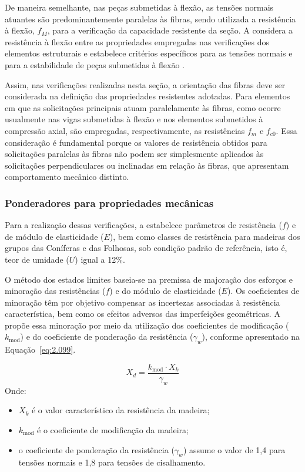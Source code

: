 De maneira semelhante, nas peças submetidas à flexão, as tensões normais atuantes
são predominantemente paralelas às fibras, sendo utilizada a resistência à
flexão, $f_M$, para a verificação da capacidade resistente da seção. A \textcite{NBR7190-1:2022} considera a resistência à flexão entre as propriedades
empregadas nas verificações dos elementos estruturais e estabelece critérios
específicos para as tensões normais e para a estabilidade de peças submetidas
à flexão .

Assim, nas verificações realizadas nesta seção, a orientação das fibras deve ser
considerada na definição das propriedades resistentes adotadas. Para elementos
em que as solicitações principais atuam paralelamente às fibras, como ocorre
usualmente nas vigas submetidas à flexão e nos elementos submetidos à compressão
axial, são empregadas, respectivamente, as resistências $f_m$ e $f_{c0}$.
Essa consideração é fundamental porque os valores de resistência obtidos para
solicitações paralelas às fibras não podem ser simplesmente aplicados às
solicitações perpendiculares ou inclinadas em relação às fibras, que apresentam
comportamento mecânico distinto.


\subsubsection{Ponderadores para propriedades mecânicas}

Para a realização dessas verificações, a \textcite{NBR7190-1:2022} estabelece parâmetros de resistência ($f$) e de módulo de elasticidade ($E$), bem como classes de resistência para madeiras dos grupos das Coníferas e das Folhosas, sob condição padrão de referência, isto é, teor de umidade ($U$) igual a 12\%.

O método dos estados limites baseia-se na premissa de majoração dos esforços e minoração das resistências ($f$) e do módulo de elasticidade ($E$).
Os coeficientes de minoração têm por objetivo compensar as incertezas associadas à resistência característica, bem como os efeitos adversos das imperfeições geométricas.
A \textcite{NBR7190-1:2022} propõe essa minoração por meio da utilização dos coeficientes de modificação ($k_{\mathrm{mod}}$) e do coeficiente de ponderação da resistência ($\gamma_w$), conforme apresentado na Equação~\eqref{eq:2.099}.

\begin{equation}
    X_d = \frac{k_{\mathrm{mod}} \cdot X_k}{\gamma_w}
\label{eq:2.099}
\end{equation}
Onde:
\begin{itemize}
    \item $X_k$ é o valor característico da resistência da madeira;
    \item $k_{\mathrm{mod}}$ é o coeficiente de modificação da madeira;
    \item o coeficiente de ponderação da resistência ($\gamma_w$) assume o valor de 1{,}4 para tensões normais e 1{,}8 para tensões de cisalhamento.
\end{itemize}

